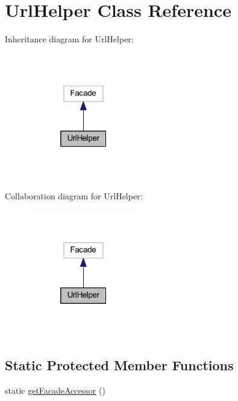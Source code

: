 \hypertarget{classhamburgscleanest_1_1_data_tables_1_1_facades_1_1_url_helper}{}\section{Url\+Helper Class Reference}
\label{classhamburgscleanest_1_1_data_tables_1_1_facades_1_1_url_helper}


Inheritance diagram for Url\+Helper\+:\nopagebreak
\begin{figure}[H]
\begin{center}
\leavevmode
\includegraphics[width=136pt]{classhamburgscleanest_1_1_data_tables_1_1_facades_1_1_url_helper__inherit__graph}
\end{center}
\end{figure}


Collaboration diagram for Url\+Helper\+:\nopagebreak
\begin{figure}[H]
\begin{center}
\leavevmode
\includegraphics[width=136pt]{classhamburgscleanest_1_1_data_tables_1_1_facades_1_1_url_helper__coll__graph}
\end{center}
\end{figure}
\subsection*{Static Protected Member Functions}
\begin{DoxyCompactItemize}
\item 
static \hyperlink{classhamburgscleanest_1_1_data_tables_1_1_facades_1_1_url_helper_a19a808201f41f32f71a0532cb49b450f}{get\+Facade\+Accessor} ()
\end{DoxyCompactItemize}


